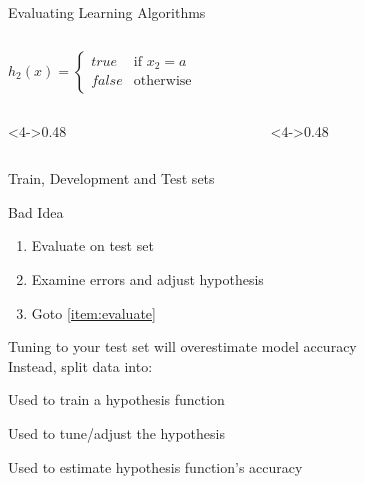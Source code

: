 \documentclass[14pt]{beamer}
\begin{document}
\begin{frame}[label=evaluating-ml]{Evaluating Learning Algorithms}
\begin{columns}
\begin{column}
$\displaystyle h_2(x) = 
\begin{cases}
\textit{true} & \text{if } x_2 = a \\
\textit{false} & \text{otherwise}
\end{cases} $ \\
\end{column}
\end{columns}
\begin{columns}
\begin{column}<4->{0.48\textwidth}
 
\end{column}
\begin{column}<4->{0.48\textwidth}
 
\end{column}
\end{columns}
\end{frame}

\begin{frame}{Train, Development and Test sets}
\begin{block}{Bad Idea}
\begin{enumerate}
\item\label{item:evaluate} Evaluate on test set
\item Examine errors and adjust hypothesis
\item Goto \ref{item:evaluate}
\end{enumerate}
\end{block}
\pause
\alert{Tuning to your test set} will overestimate model accuracy\\
\pause
\bigskip
Instead, split data into:
\begin{description}[Train]
\item[Train] Used to train a hypothesis function
\item[Dev] Used to tune/adjust the hypothesis
\item[Test] Used to estimate hypothesis function's accuracy
\end{description}
\end{frame}
\end{document}
